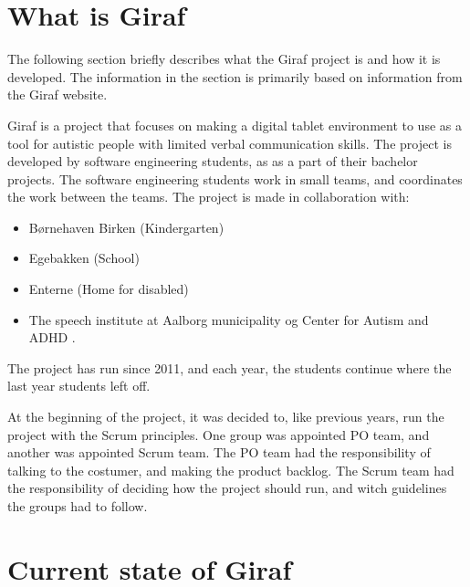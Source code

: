 \section{What is Giraf} %
\label{cha:What is Giraf}

The following section briefly describes what the Giraf project is and how it is developed. The information in the section is primarily based on information from the Giraf website\cite{GirafWebsite}. \newline 

\par \noindent
Giraf is a project that focuses on making a digital tablet environment to use as a tool for autistic people with limited verbal communication skills. The project is developed by software engineering students, as as a part of their bachelor projects.  The software engineering students work in small teams, and coordinates the work between the teams. The project is made in collaboration with:
\begin{itemize}
    \item Børnehaven Birken (Kindergarten) \cite{bhBirken} 
    \item Egebakken (School) \cite{egebakken} 
    \item Enterne (Home for disabled) \cite{enterne}
    \item The speech institute at Aalborg municipality og Center for Autism and ADHD \cite{center_for_autism}.     
\end{itemize} 
The project has run since 2011, and each year, the students continue where the last year students left off. \newline 

\par \noindent
At the beginning of the project, it was decided to, like previous years, run the project with the Scrum principles. One group was appointed \gls{PO} team, and another was appointed Scrum team. The \gls{PO} team had the responsibility of talking to the costumer, and making the product backlog. The Scrum team had the responsibility of deciding how the project should run, and witch guidelines the groups had to follow. 

\section{Current state of Giraf}

